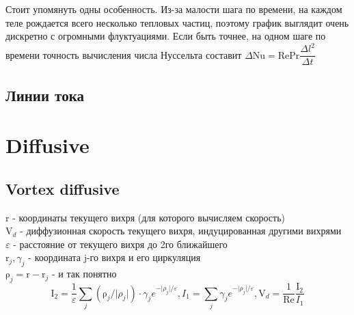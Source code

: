 \documentclass[14pt]{extreport}
\newcommand{\br}[1]{\boldsymbol{\mathrm{#1}}}
\newcommand{\Reyn}{\text{Re}}
\newcommand{\Pran}{\text{Pr}}
\newcommand{\Nuss}{\text{Nu}}
\begin{document}
Стоит упомянуть одны особенность. Из-за малости шага по времени, на каждом теле рождается всего несколько тепловых частиц, поэтому график выглядит очень дискретно с огромными флуктуациями. Если быть точнее, на одном шаге по времени точность вычисления числа Нуссельта составит $\Delta \Nuss = \Reyn \Pran \dfrac{\Delta l^2}{\Delta t }$


\subsection{Линии тока}


\newpage
\section{Diffusive}
\subsection{Vortex diffusive}

$\br r$ - координаты текущего вихря (для которого вычисляем скорость) \\
$\br V_d$ - диффузионная скорость текущего вихря, индуцированная другими вихрями \\
$\varepsilon$ - расстояние от текущего вихря до 2го ближайшего \\
$\br r_j, \gamma_j$ - координата j-го вихря и его циркуляция \\
$\br\rho_j = \br r - \br r_j$ - и так понятно \\

\begin{equation*}
\br I_2 = \dfrac{1}{\varepsilon}
\sum\limits_j (\br\rho_j / \lvert\rho_j\rvert)\cdot\gamma_j e^{-\lvert\rho_j\rvert/\varepsilon},
I_1 = {\sum\limits_j \gamma_j e^{-\lvert\rho_j\rvert/\varepsilon}},
\br V_d = \dfrac{1}{\Reyn} \dfrac{\br I_2}{I_1}
\end{equation*}

\begin{center}\setlength\fboxsep{0pt}
\setlength\fboxrule{0.5pt}
\end{center}
\end{document}
